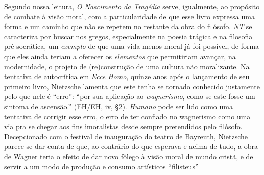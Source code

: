 \documentclass[
	12pt,				%
	openright,			%
	oneside,			%
	a4paper,			%
	english,			%
	french,				%
	spanish,			%
	brazil				%
	]{abntex2}
\newcommand{\Hum}{\textit{Humano}\xspace}
\begin{document}
	Segundo nossa leitura, \textit{O Nascimento da Tragédia} serve, igualmente, ao propósito de combate à visão moral, com a particularidade de que esse livro expressa uma forma e um caminho que não se repetem no restante da obra do filósofo. \textit{NT} se caracteriza por buscar nos gregos, especialmente na poesia trágica e na filosofia pré-socrática, um \textit{exemplo} de que uma vida menos moral já foi possível, de forma que eles ainda teriam a oferecer os \textit{elementos} que permitiriam avançar, na modernidade, o projeto de (re)construção de uma cultura não moralizante. Na tentativa de autocrítica em \textit{Ecce Homo}, quinze anos após o lançamento de seu primeiro livro, Nietzsche lamenta que este tenha se tornado conhecido justamente pelo que nele é “erro”: “por sua aplicação ao \textit{wagnerismo}, como se este fosse um sintoma de ascensão.” (EH/EH, iv, §2). \Hum pode ser lido como uma tentativa de corrigir esse erro, o erro de ter confiado no wagnerismo como uma via pra se chegar aos fins imoralistas desde sempre pretendidos pelo filósofo. Decepcionado com o festival de inauguração do teatro de Bayreuth, Nietzsche parece se dar conta de que, ao contrário do que esperava e acima de tudo, a obra de Wagner teria o efeito de dar novo fôlego à visão moral de mundo cristã, e de servir a um modo de produção e consumo artísticos “filisteus”
\end{document}
